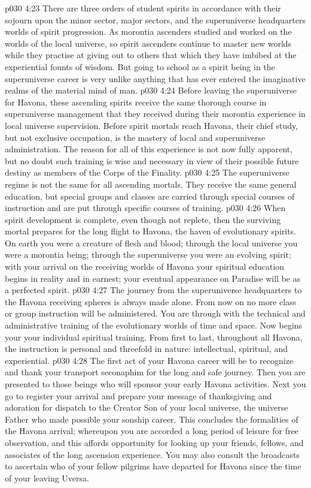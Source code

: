 \vs p030 4:23 There are three orders of student spirits in accordance with their sojourn upon the minor sector, major sectors, and the superuniverse headquarters worlds of spirit progression. As morontia ascenders studied and worked on the worlds of the local universe, so spirit ascenders continue to master new worlds while they practise at giving out to others that which they have imbibed at the experiential founts of wisdom. But going to school as a spirit being in the superuniverse career is very unlike anything that has ever entered the imaginative realms of the material mind of man.
\vs p030 4:24 Before leaving the superuniverse for Havona, these ascending spirits receive the same thorough course in superuniverse management that they received during their morontia experience in local universe supervision. Before spirit mortals reach Havona, their chief study, but not exclusive occupation, is the mastery of local and superuniverse administration. The reason for all of this experience is not now fully apparent, but no doubt such training is wise and necessary in view of their possible future destiny as members of the Corps of the Finality.
\vs p030 4:25 The superuniverse regime is not the same for all ascending mortals. They receive the same general education, but special groups and classes are carried through special courses of instruction and are put through specific courses of training.
\vs p030 4:26 \bibnobreakspace {} When spirit development is complete, even though not replete, then the surviving mortal prepares for the long flight to Havona, the haven of evolutionary spirits. On earth you were a creature of flesh and blood; through the local universe you were a morontia being; through the superuniverse you were an evolving spirit; with your arrival on the receiving worlds of Havona your spiritual education begins in reality and in earnest; your eventual appearance on Paradise will be as a perfected spirit.
\vs p030 4:27 The journey from the superuniverse headquarters to the Havona receiving spheres is always made alone. From now on no more class or group instruction will be administered. You are through with the technical and administrative training of the evolutionary worlds of time and space. Now begins your  your individual spiritual training. From first to last, throughout all Havona, the instruction is personal and threefold in nature: intellectual, spiritual, and experiential.
\vs p030 4:28 The first act of your Havona career will be to recognize and thank your transport seconaphim for the long and safe journey. Then you are presented to those beings who will sponsor your early Havona activities. Next you go to register your arrival and prepare your message of thanksgiving and adoration for dispatch to the Creator Son of your local universe, the universe Father who made possible your sonship career. This concludes the formalities of the Havona arrival; whereupon you are accorded a long period of leisure for free observation, and this affords opportunity for looking up your friends, fellows, and associates of the long ascension experience. You may also consult the broadcasts to ascertain who of your fellow pilgrims have departed for Havona since the time of your leaving Uversa.
